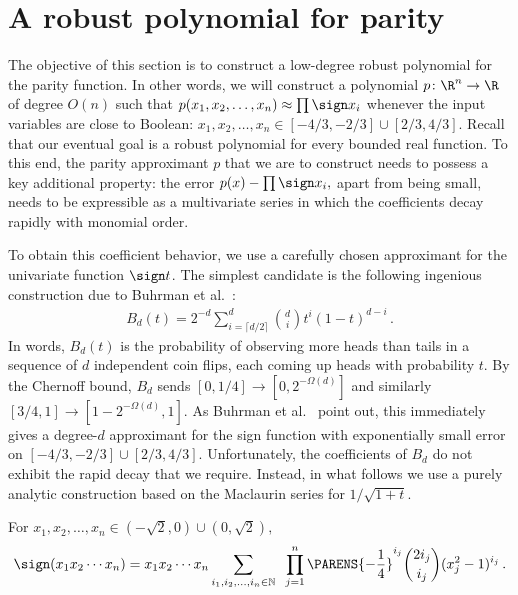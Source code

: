 \section{A robust polynomial for parity}
\label{sec:robust-parity}

The objective of this section is to construct
a low-degree robust polynomial
for the parity function. In 
other words, we will construct a polynomial
$p\colon\R^n\to\R$ of degree $O(n)$ such that
$p(x_1,x_2,\dots,x_n) \approx \prod \sign x_i$ whenever the
input variables are close to Boolean:
$x_1,x_2,\dots,x_n\in[-4/3,-2/3]\cup[2/3,4/3]$. 
Recall that our eventual goal is a robust polynomial
for every bounded real function. To this end, the parity
approximant $p$ that we are to construct needs to 
possess a key additional
property: the error \mbox{$p(x)-\prod\sign x_i,$} apart from
being small, needs to be expressible as a
multivariate series in which the coefficients decay
rapidly with monomial order. 

To obtain this coefficient behavior, we use a carefully
chosen approximant for the univariate function
$\sign t$. The simplest candidate is 
the following ingenious construction due to 
Buhrman et al.~\cite{robust}:
\begin{align*}
B_d(t) = 2^{-d} \sum_{i=\lceil d/2\rceil}^d {d\choose i}
t^i(1-t)^{d-i}\,.
\end{align*}
In words, $B_d(t)$ is the probability of observing
more heads than tails in a sequence of $d$ independent
coin flips, each coming up heads with probability $t$.
By the Chernoff bound, $B_d$ sends
$[0,1/4]\to[0,2^{-\Omega(d)}]$ and similarly
$[3/4,1]\to[1-2^{-\Omega(d)},1]$. As Buhrman et
al.~\cite{robust} point out, this immediately gives a
degree-$d$ approximant for the sign function with
exponentially small error on
$[-4/3,-2/3]\cup[2/3,4/3]$. Unfortunately, the
coefficients of $B_d$ do not
exhibit the rapid decay that we require.
Instead, in what follows
we use a purely analytic construction based on the
Maclaurin series for $1/\sqrt{1+t}$. 

\begin{lemma}
\label{lem:parity-robust}
For $x_1,x_2,\dots,x_n\in(-\sqrt 2,0)\cup(0,\sqrt 2),$
\begin{align}
\label{eqn:parity-maclaurin}
\sign (x_1x_2\cdots x_n) =
x_1x_2\cdots x_n \sum_{i_1,i_2,\dots,i_n\in\mathbb N} 
\;\; \prod_{j=1}^n \PARENS{-\frac14}^{i_j}{2i_j \choose i_j}
(x_j^2-1)^{i_j}\,.
\end{align}
\end{lemma}


